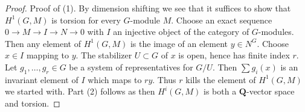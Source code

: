 \documentclass[10pt,a4paper]{amsart}
\theoremstyle{plain}
\theoremstyle{definition}
\theoremstyle{remark}
\numberwithin{equation}{subsection}
\begin{document}
\begin{proof}
Proof of (1). By dimension shifting we see that it suffices
to show that $H^1(G, M)$ is torsion for every $G$-module $M$.
Choose an exact sequence $0 \to M \to I \to N \to 0$ with $I$
an injective object of the category of $G$-modules.
Then any element of $H^1(G, M)$ is the image of an element
$y \in N^G$. Choose $x \in I$ mapping to $y$.
The stabilizer $U \subset G$ of $x$ is open, hence
has finite index $r$. Let $g_1, \ldots, g_r \in G$ be a system
of representatives for $G/U$. Then $\sum g_i(x)$ is an invariant
element of $I$ which maps to $ry$. Thus $r$ kills the element
of $H^1(G, M)$ we started with. Part (2) follows as then
$H^i(G, M)$ is both a $\mathbf{Q}$-vector space and torsion.
\end{proof}
\end{document}
